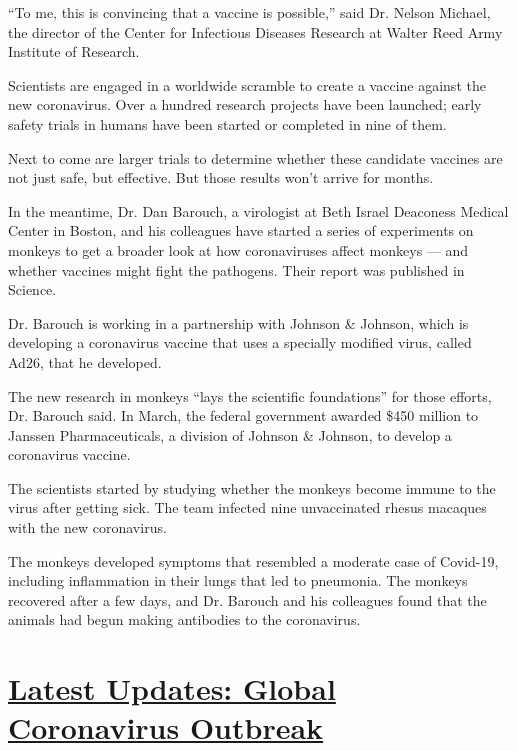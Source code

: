 ``To me, this is convincing that a vaccine is possible,'' said Dr.
Nelson Michael, the director of the Center for Infectious Diseases
Research at Walter Reed Army Institute of Research.

Scientists are engaged in a worldwide scramble to create a vaccine
against the new coronavirus. Over a hundred research projects have been
launched; early safety trials in humans have been started or completed
in nine of them.

Next to come are larger trials to determine whether these candidate
vaccines are not just safe, but effective. But those results won't
arrive for months.

In the meantime, Dr. Dan Barouch, a virologist at Beth Israel Deaconess
Medical Center in Boston, and his colleagues have started a series of
experiments on monkeys to get a broader look at how coronaviruses affect
monkeys --- and whether vaccines might fight the pathogens. Their report
was published in Science.

Dr. Barouch is working in a partnership with Johnson \& Johnson, which
is developing a coronavirus vaccine that uses a specially modified
virus, called Ad26, that he developed.

The new research in monkeys ``lays the scientific foundations'' for
those efforts, Dr. Barouch said. In March, the federal government
awarded \$450 million to Janssen Pharmaceuticals, a division of Johnson
\& Johnson, to develop a coronavirus vaccine.

The scientists started by studying whether the monkeys become immune to
the virus after getting sick. The team infected nine unvaccinated rhesus
macaques with the new coronavirus.

The monkeys developed symptoms that resembled a moderate case of
Covid-19, including inflammation in their lungs that led to pneumonia.
The monkeys recovered after a few days, and Dr. Barouch and his
colleagues found that the animals had begun making antibodies to the
coronavirus.

\hypertarget{latest-updates-global-coronavirus-outbreak}{%
\section{\texorpdfstring{\href{https://www.nytimes.com/2020/08/01/world/coronavirus-covid-19.html?action=click\&pgtype=Article\&state=default\&region=MAIN_CONTENT_1\&context=storylines_live_updates}{Latest
Updates: Global Coronavirus
Outbreak}}{Latest Updates: Global Coronavirus Outbreak}}\label{latest-updates-global-coronavirus-outbreak}}

